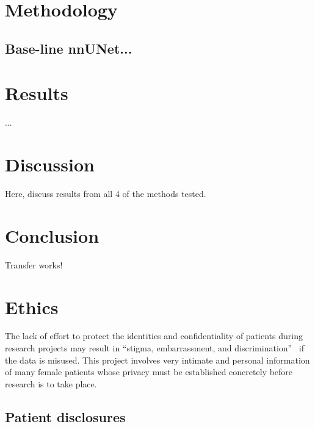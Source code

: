 \documentclass[12pt,twoside]{report}
\begin{document}
\chapter{Methodology}

\section{Base-line nnUNet...}

\chapter{Results}

...

\chapter{Discussion}

Here, discuss results from all 4 of the methods tested.

\chapter{Conclusion}

Transfer works!

\chapter{Ethics}

The lack of effort to protect the identities and confidentiality of patients during research projects may result in ``stigma, embarrassment, and discrimination''~\cite{health-privacy} if the data is misused.
This project involves very intimate and personal information of many female patients whose privacy must be established concretely before research is to take place.%

\section{Patient disclosures}
\end{document}
